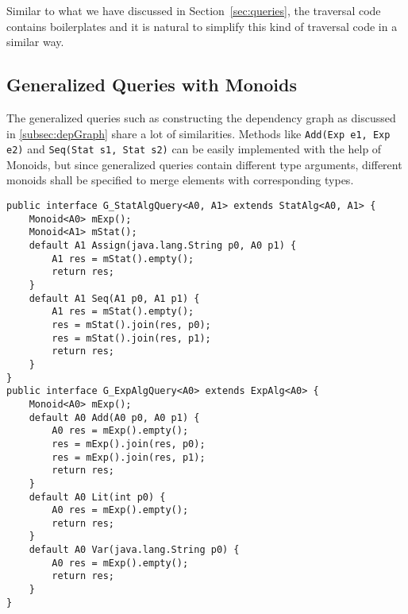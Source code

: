 Similar to what we have discussed in Section~\ref{sec:queries}, the traversal code contains boilerplates and it is natural to simplify this kind of traversal code in a similar way. 

\subsection{Generalized Queries with Monoids}\label{subsec:generalizedQuery}
The generalized queries such as constructing the dependency graph as discussed in \ref{subsec:depGraph} share a lot of similarities. Methods like \lstinline{Add(Exp e1, Exp e2)} and \lstinline{Seq(Stat s1, Stat s2)} can be easily implemented with the help of Monoids, but since generalized queries contain different type arguments, different monoids shall be specified to merge elements with corresponding types. 

\begin{comment}
\begin{lstlisting}[numbers=none]
public interface G_StatAlgQuery<A0, A1> extends StatAlg<A0, A1>, ExpAlg<A0> { 
	Monoid<A0> mExp();
	Monoid<A1> mStat();
	default A0 Add(A0 p0, A0 p1) {
		A0 res = mExp().empty();
		res = mExp().join(res, p0);
		res = mExp().join(res, p1);
		return res;
	}
	default A0 Lit(int p0) {
		A0 res = mExp().empty();
		return res;
	}
	default A0 Var(java.lang.String p0) {
		A0 res = mExp().empty();
		return res;
	}
	default A1 Assign(java.lang.String p0, A0 p1) {
		A1 res = mStat().empty();
		return res;
	}
	default A1 Seq(A1 p0, A1 p1) {
		A1 res = mStat().empty();
		res = mStat().join(res, p0);
		res = mStat().join(res, p1);
		return res;
	}
}
\end{lstlisting}
\end{comment}


\begin{lstlisting}[numbers=none]
public interface G_StatAlgQuery<A0, A1> extends StatAlg<A0, A1> {
	Monoid<A0> mExp();
	Monoid<A1> mStat();
	default A1 Assign(java.lang.String p0, A0 p1) {
		A1 res = mStat().empty();
		return res;
	}
	default A1 Seq(A1 p0, A1 p1) {
		A1 res = mStat().empty();
		res = mStat().join(res, p0);
		res = mStat().join(res, p1);
		return res;
	}
}
public interface G_ExpAlgQuery<A0> extends ExpAlg<A0> {
	Monoid<A0> mExp();
	default A0 Add(A0 p0, A0 p1) {
		A0 res = mExp().empty();
		res = mExp().join(res, p0);
		res = mExp().join(res, p1);
		return res;
	}
	default A0 Lit(int p0) {
		A0 res = mExp().empty();
		return res;
	}
	default A0 Var(java.lang.String p0) {
		A0 res = mExp().empty();
		return res;
	}
}
\end{lstlisting}

